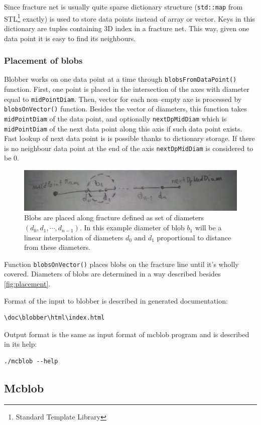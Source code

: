 Since fracture net is usually quite sparse dictionary structure
(\texttt{std::map} from STL\footnote{Standard Template Library} exactly) is
used to store data points instead of array or vector. Keys in this dictionary
are tuples containing 3D index in a fracture net. This way, given one data point
it is easy to find its neighbours.

\subsubsection{Placement of blobs}

Blobber works on one data point at a time through \texttt{blobsFromDataPoint()}
function. First, one point is placed in the intersection of the axes with
diameter equal to \texttt{mid\-Point\-Diam}. Then, vector for each non--empty
axe is processed by \texttt{blobsOnVector()} function. Besides the vector of
diameters, this function takes \texttt{midPointDiam} of the data point, and optionally
\texttt{nextDpMidDiam} which is \texttt{midPointDiam} of the next data point
along this axis if such data point exists. Fast lookup of next data point is
is possible thanks to dictionary storage. If there is no neighbour data
point at the end of the axis \texttt{nextDpMidDiam} is considered to be 0.

\begin{figure}[htb]
  \begin{center}
    \includegraphics[width=\textwidth]{chapters/project/placement.jpg}
  \end{center}
  \caption{Blobs are placed along fracture defined as set of diameters
    $(d_0,d_1,\cdots,d_{n-1})$. In this example diameter of blob $b_1$ will be a
    linear interpolation of diameters $d_0$ and $d_1$ proportional to distance
    from these diameters.}
  \label{fig:placement}
\end{figure}

Function \texttt{blobsOnVector()} places blobs on the fracture line until
it's wholly covered. Diameters of blobs are determined in a way described
besides \autoref{fig:placement}.

Format of the input to blobber is described in generated documentation:
\begin{verbatim}
\doc\blobber\html\index.html
\end{verbatim}

Output format is the same as input format of mcblob program and is described in
its help:
\begin{verbatim}
./mcblob --help
\end{verbatim}

\subsection{Mcblob}

